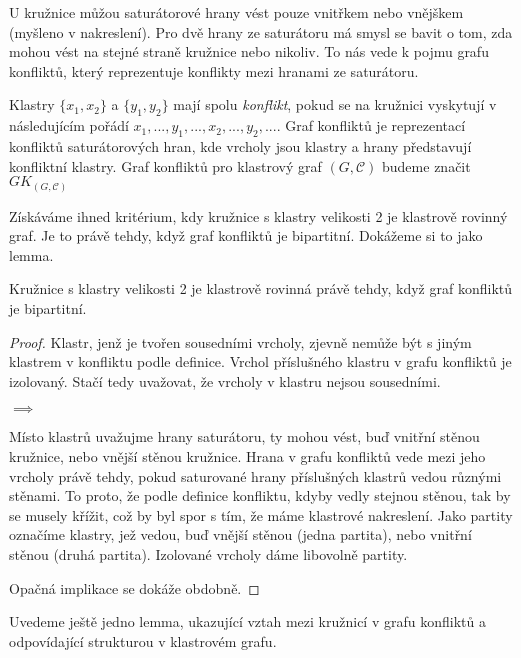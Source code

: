 U kružnice můžou saturátorové hrany vést pouze vnitřkem nebo vnějškem (myšleno v nakreslení). Pro dvě hrany ze saturátoru má smysl se bavit o tom, zda mohou vést na stejné straně kružnice nebo nikoliv. To nás vede k pojmu grafu konfliktů, který reprezentuje konflikty mezi hranami ze saturátoru. 

\begin{defn}
 Klastry $\{x_1, x_2\}$ a $\{y_1, y_2\}$ mají spolu \textit{konflikt}, pokud se na kružnici vyskytují v následujícím pořádí $x_1 , ..., y_1, ..., x_2, ..., y_2, ...$. Graf konfliktů je reprezentací konfliktů saturátorových hran, kde vrcholy jsou klastry a hrany představují konfliktní klastry. Graf konfliktů pro klastrový graf $(G,\mathcal C)$ budeme značit $GK_{(G,\mathcal C)}$
\end{defn}

Získáváme ihned kritérium, kdy kružnice s klastry velikosti 2 je klastrově rovinný graf. Je to právě tehdy, když graf konfliktů je bipartitní. Dokážeme si to jako lemma.

\begin{lemma}\label{lemma_ekv_graf_konf_kl_rov}Kružnice s klastry velikosti 2 je klastrově rovinná právě tehdy, když graf konfliktů je bipartitní.
\end{lemma}
\begin{proof}
Klastr, jenž je tvořen sousedními vrcholy, zjevně nemůže být s jiným klastrem v konfliktu podle definice. Vrchol příslušného klastru v grafu konfliktů je izolovaný. Stačí tedy uvažovat, že vrcholy v klastru nejsou sousedními.

$\implies$

Místo klastrů uvažujme hrany saturátoru, ty mohou vést, buď vnitřní stěnou kružnice, nebo vnější stěnou kružnice. Hrana v grafu konfliktů vede mezi jeho vrcholy právě tehdy, pokud saturované hrany příslušných klastrů vedou různými stěnami. To proto, že podle definice konfliktu, kdyby vedly stejnou stěnou, tak by se musely křížit, což by byl spor s tím, že máme klastrové nakreslení. Jako partity označíme klastry, jež vedou, buď vnější stěnou (jedna partita), nebo vnitřní stěnou (druhá partita). Izolované vrcholy dáme libovolně partity.

Opačná implikace se dokáže obdobně.
\end{proof}

Uvedeme ještě jedno lemma, ukazující vztah mezi kružnicí v grafu konfliktů a odpovídající strukturou v klastrovém grafu.

